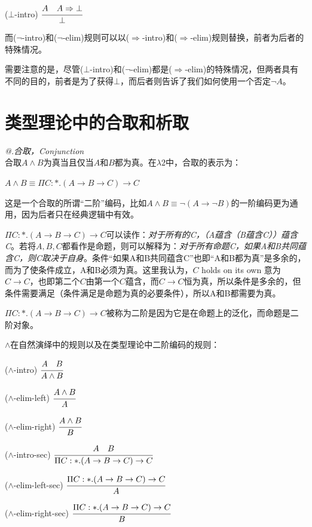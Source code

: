 \documentclass[UTF8]{article}
\makeatletter
\newcommand{\Rmnum}[1]{\expandafter\@slowromancap\romannumeral #1@}
\makeatother
\begin{document}
		($\bot$-intro) $\cfrac{A\ \ \ A\Rightarrow\bot}{\bot}$
		
		而($\neg$-intro)和($\neg$-elim)规则可以以($\Rightarrow$-intro)和($\Rightarrow$-elim)规则替换，前者为后者的特殊情况。
		
		需要注意的是，尽管($\bot$-intro)和($\neg$-elim)都是($\Rightarrow$-elim)的特殊情况，但两者具有不同的目的，前者是为了获得$\bot$，而后者则告诉了我们如何使用一个否定$\neg A$。
		
	\section{类型理论中的合取和析取}
	\noindent
	\textit{\Rmnum{1}.合取，Conjunction}\\
	合取$A\land B$为真当且仅当$A$和$B$都为真。在$\lambda{2}$中，合取的表示为：
	
		$A\land B\equiv\Pi C:*.(A\rightarrow B\rightarrow C)\rightarrow C$
		
		这是一个合取的所谓“二阶”编码，比如$A\land B\equiv\neg(A\rightarrow\neg B)$的一阶编码更为通用，因为后者只在经典逻辑中有效。
		
		$\Pi C:*.(A\rightarrow B\rightarrow C)\rightarrow C$可以读作：\textit{对于所有的C，（A蕴含（B蕴含C））蕴含C}。若将$A,B,C$都看作是命题，则可以解释为：\textit{对于所有命题C，如果A和B共同蕴含C，则C取决于自身}。条件“如果A和B共同蕴含C”也即“A和B都为真”是多余的，而为了使条件成立，A和B必须为真。这里我认为，$C$ holds on its own 意为 $C\rightarrow C$，也即第二个$C$由第一个$C$蕴含，而$C\rightarrow C$恒为真，所以条件是多余的，但条件需要满足（条件满足是命题为真的必要条件），所以A和B都需要为真。
		
		$\Pi C:*.(A\rightarrow B\rightarrow C)\rightarrow C$被称为二阶是因为它是在命题上的泛化，而命题是二阶对象。
		
		$\land$在自然演绎中的规则以及在类型理论中二阶编码的规则：
		
		($\land$-intro) $\cfrac{A\ \ \ B}{A\land B}$
		
		($\land$-elim-left) $\cfrac{A\land B}{A}$
		
		($\land$-elim-right) $\cfrac{A\land B}{B}$
		
		($\land$-intro-sec) $\cfrac{A\ \ \ B}{\Pi C:*.(A\rightarrow B\rightarrow C)\rightarrow C}$ 
		
		($\land$-elim-left-sec) $\cfrac{\Pi C:*.(A\rightarrow B\rightarrow C)\rightarrow C}{A}$
		
		($\land$-elim-right-sec) $\cfrac{\Pi C:*.(A\rightarrow B\rightarrow C)\rightarrow C}{B}$ \\
		
\end{document}
